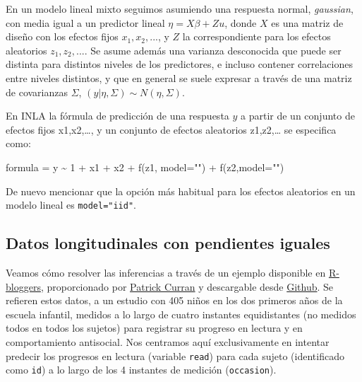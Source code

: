 \documentclass[
]{book}
\newenvironment{Shaded}{\begin{snugshade}}{\end{snugshade}}
\newcommand{\AttributeTok}[1]{\textcolor[rgb]{0.77,0.63,0.00}{#1}}
\newcommand{\DecValTok}[1]{\textcolor[rgb]{0.00,0.00,0.81}{#1}}
\newcommand{\FunctionTok}[1]{\textcolor[rgb]{0.00,0.00,0.00}{#1}}
\newcommand{\NormalTok}[1]{#1}
\newcommand{\OtherTok}[1]{\textcolor[rgb]{0.56,0.35,0.01}{#1}}
\newcommand{\SpecialCharTok}[1]{\textcolor[rgb]{0.00,0.00,0.00}{#1}}
\newcommand{\StringTok}[1]{\textcolor[rgb]{0.31,0.60,0.02}{#1}}
\begin{document}
En un modelo lineal mixto seguimos asumiendo una respuesta normal, \emph{gaussian}, con media igual a un predictor lineal \(\eta=X\beta + Z u\), donde \(X\) es una matriz de diseño con los efectos fijos \(x_1,x_2,...\), y \(Z\) la correspondiente para los efectos aleatorios \(z_1, z_2,...\). Se asume además una varianza desconocida que puede ser distinta para distintos niveles de los predictores, e incluso contener correlaciones entre niveles distintos, y que en general se suele expresar a través de una matriz de covarianzas \(\Sigma\), \((y|\eta,\Sigma) \sim N(\eta,\Sigma)\).

En INLA la fórmula de predicción de una respuesta \(y\) a partir de un conjunto de efectos fijos x1,x2,\ldots, y un conjunto de efectos aleatorios z1,z2,\ldots{} se especifica como:

\begin{Shaded}
\begin{Highlighting}[]
\NormalTok{formula }\OtherTok{=}\NormalTok{ y }\SpecialCharTok{\textasciitilde{}} \DecValTok{1} \SpecialCharTok{+}\NormalTok{ x1 }\SpecialCharTok{+}\NormalTok{ x2  }\SpecialCharTok{+} \FunctionTok{f}\NormalTok{(z1, }\AttributeTok{model=}\StringTok{""}\NormalTok{) }\SpecialCharTok{+} \FunctionTok{f}\NormalTok{(z2,}\AttributeTok{model=}\StringTok{""}\NormalTok{) }
\end{Highlighting}
\end{Shaded}

De nuevo mencionar que la opción más habitual para los efectos aleatorios en un modelo lineal es \texttt{model="iid"}.

\hypertarget{datos-longitudinales-con-pendientes-iguales}{%
\subsection{Datos longitudinales con pendientes iguales}\label{datos-longitudinales-con-pendientes-iguales}}

Veamos cómo resolver las inferencias a través de un ejemplo disponible en \href{https://www.r-bloggers.com/2019/09/bayesian-linear-mixed-models-random-intercepts-slopes-and-missing-data/}{R-bloggers}, proporcionado por \href{https://curran.web.unc.edu/}{Patrick Curran} y descargable desde \href{https://github.com/MultiLevelAnalysis/Datasets-third-edition-Multilevel-book/blob/master/chapter\%205/Curran/CurranLong.sav}{Github}. Se refieren estos datos, a un estudio con 405 niños en los dos primeros años de la escuela infantil, medidos a lo largo de cuatro instantes equidistantes (no medidos todos en todos los sujetos) para registrar su progreso en lectura y en comportamiento antisocial. Nos centramos aquí exclusivamente en intentar predecir los progresos en lectura (variable \texttt{read}) para cada sujeto (identificado como \texttt{id}) a lo largo de los 4 instantes de medición (\texttt{occasion}).
\end{document}
